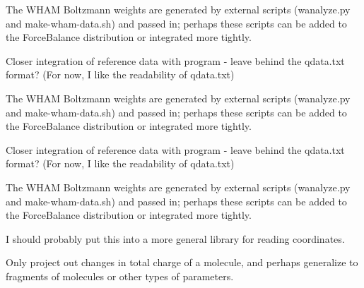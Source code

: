 \begin{DoxyRefList}
\-The \-W\-H\-A\-M \-Boltzmann weights are generated by external scripts (wanalyze.\-py and make-\/wham-\/data.\-sh) and passed in; perhaps these scripts can be added to the \-Force\-Balance distribution or integrated more tightly.

\-Closer integration of reference data with program -\/ leave behind the qdata.\-txt format? (\-For now, \-I like the readability of qdata.\-txt)

\-The \-W\-H\-A\-M \-Boltzmann weights are generated by external scripts (wanalyze.\-py and make-\/wham-\/data.\-sh) and passed in; perhaps these scripts can be added to the \-Force\-Balance distribution or integrated more tightly.

\-Closer integration of reference data with program -\/ leave behind the qdata.\-txt format? (\-For now, \-I like the readability of qdata.\-txt)

\-The \-W\-H\-A\-M \-Boltzmann weights are generated by external scripts (wanalyze.\-py and make-\/wham-\/data.\-sh) and passed in; perhaps these scripts can be added to the \-Force\-Balance distribution or integrated more tightly. 
\item[\label{todo__todo000006}%
\hypertarget{todo__todo000006}{}%
\-Member \hyperlink{classforcebalance_1_1counterpoise_1_1Counterpoise_a8795bd01b0f62b3f612e4e5c762f96f8}{forcebalance.counterpoise.\-Counterpoise.loadxyz} ]\-I should probably put this into a more general library for reading coordinates.  
\item[\label{todo__todo000008}%
\hypertarget{todo__todo000008}{}%
\-Member \hyperlink{classforcebalance_1_1forcefield_1_1FF_acf0ce8fc4e9fbf5257f93d14d4a4f10f}{forcebalance.forcefield.\-F\-F.mktransmat} ]\-Only project out changes in total charge of a molecule, and perhaps generalize to fragments of molecules or other types of parameters. 


\end{DoxyRefList}
